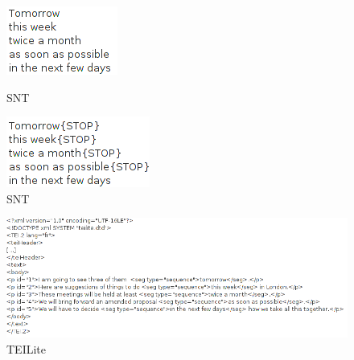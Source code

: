 \begin{figure}[h!]
	\begin{minipage}[h!]{0.5\linewidth}
		\centering
		\includegraphics[scale=0.6]{resources/img/fig8-1tomorrow.png}	
		\caption{SNT\label{fig8-1CorpusTxt}}
		\label{fig7-TXT}
	\end{minipage}
	\hspace{0.1cm}
	\begin{minipage}[h!]{0.5\linewidth}
		\centering
		\includegraphics[scale=0.6]{resources/img/fig8-2tomorrowSNT.png}
		\caption{SNT\label{fig8-2CorpusSNT}}
	\end{minipage}
	\hspace{0.1cm}
\end{figure}
\begin{figure}[h!]
	\begin{minipage}[h!]{\linewidth}
		\centering
			\includegraphics[width=14cm]{resources/img/fig8-3tomorrowTEI.png}
			\caption{TEILite\label{fig8-3CorpusTEI}}
	\end{minipage}
\end{figure}
